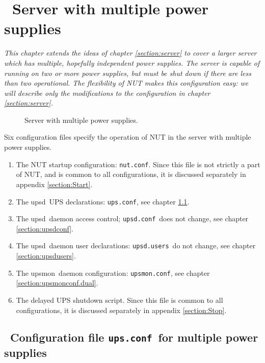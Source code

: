 \documentclass[12pt]{article}
\newlength{\headersep}\setlength{\headersep}{3mm}
\newcommand{\Hsep}{\hspace{\headersep}}
\newcommand{\upsd}{\mbox{\textcolor{UPSDCOLOUR}{upsd}}}
\newcommand{\upsmon}{\mbox{\textcolor{MONCOLOUR}{upsmon}}}
\newcommand{\nutconf}{\textcolor{NUTCOLOUR}{\texttt{nut.conf}}}
\newcommand{\upsconf}{\textcolor{UPSDCOLOUR}{\texttt{ups.conf}}}
\newcommand{\upsdconf}{\textcolor{UPSDCOLOUR}{\texttt{upsd.conf}}}
\newcommand{\upsdusers}{\textcolor{UPSDCOLOUR}{\texttt{upsd.users}}}
\newcommand{\upsmonconf}{\textcolor{MONCOLOUR}{\texttt{upsmon.conf}}}
\newcommand{\ol}{\begin{enumerate}%
   \setlength{\itemsep}{0em}}
\newcommand{\eol}{\end{enumerate}}
\newcommand{\li}{\item}                 %
\newcommand{\Ref}[1]{\ref{#1}}
\begin{document}
\section{\Hsep\ Server with multiple power supplies}\label{section:dual}

\textsl{This chapter extends the ideas of chapter \ref{section:server} to
  cover a larger server which has multiple, hopefully independent power
  supplies.  The server is capable of running on two or more power supplies,
  but must be shut down if there are less than two operational.  The
  flexibility of NUT makes this configuration easy: we will describe only the
  modifications to the configuration in chapter \ref{section:server}.}

\begin{figure}[ht]
\begin{center}
\end{center}
\vspace{-6mm}
\caption{Server with multiple power supplies.\label{fig:dual}}
\end{figure}

Six configuration files specify the operation of NUT in the server with multiple
power supplies.

\ol

\li The NUT startup configuration: \nutconf.  Since this file is not strictly
a part of NUT, and is common to all configurations, it is discussed separately
in appendix \Ref{section:Start}.

\li The \upsd\ UPS declarations: \upsconf, see chapter \ref{section:upsconf.dual}.

\li The \upsd\ daemon access control; \upsdconf\ does not change, see chapter
\ref{section:upsdconf}.

\li The \upsd\ daemon user declarations: \upsdusers\ do not change, see chapter
\ref{section:upsdusers}.

\li The \upsmon\ daemon configuration: \upsmonconf, see chapter
\ref{section:upsmonconf.dual}.

\li The delayed UPS shutdown script.  Since this file is common to all
configurations, it is discussed separately in appendix \Ref{section:Stop}.

\eol


\subsection{\Hsep\ Configuration file \upsconf\ for multiple power supplies}\label{section:upsconf.dual}
\end{document}
